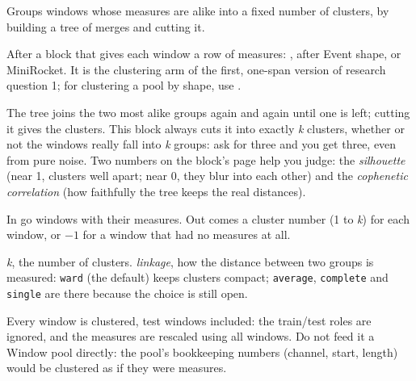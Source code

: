 Groups windows whose measures are alike into a fixed number of clusters, by building a tree of
merges and cutting it.

After a block that gives each window a row of measures:
,  after Event shape, or
MiniRocket. It is the clustering arm of the first, one-span version of research question 1;
for clustering a pool by shape, use .

\begin{plainterms}
The tree joins the two most alike groups again and again until one is left; cutting it gives the
clusters. This block always cuts it into exactly \emph{k} clusters, whether or not the windows
really fall into \emph{k} groups: ask for three and you get three, even from pure noise. Two
numbers on the block's page help you judge: the \emph{silhouette} (near 1, clusters well apart;
near 0, they blur into each other) and the \emph{cophenetic correlation} (how faithfully the tree
keeps the real distances).
\end{plainterms}

In go windows with their measures. Out comes a cluster number (1 to \emph{k}) for each window,
or $-1$ for a window that had no measures at all.

\emph{k}, the number of clusters. \emph{linkage}, how the distance between two groups is
measured: \texttt{ward} (the default) keeps clusters compact; \texttt{average},
\texttt{complete} and \texttt{single} are there because the choice is still open.

Every window is clustered, test windows included: the train/test roles are ignored, and the
measures are rescaled using all windows. Do not feed it a Window pool directly: the pool's
bookkeeping numbers (channel, start, length) would be clustered as if they were measures.
